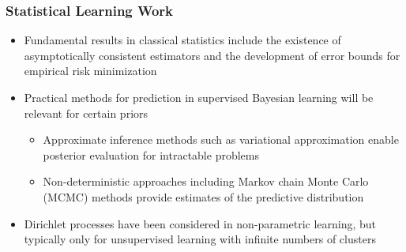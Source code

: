 \documentclass[aspectratio=169,usenames,dvipsnames]{beamer}
\begin{document}
\begin{frame}
\frametitle{Statistical Learning Work}

\begin{itemize}
\item Fundamental results in classical statistics include the existence of asymptotically consistent estimators  and the development of error bounds for empirical risk minimization 
\vspace{0.5em}
\item Practical methods for prediction in supervised Bayesian learning will be relevant for certain priors
	\vspace{0.25em}
	\begin{itemize}
	\item Approximate inference methods such as variational approximation  enable posterior evaluation for intractable problems
	\vspace{0.25em}
	\item Non-deterministic approaches including Markov chain Monte Carlo (MCMC) methods  provide estimates of the predictive distribution
	\end{itemize}
\vspace{0.5em}
\item Dirichlet processes have been considered in non-parametric learning, but typically only for unsupervised learning with infinite numbers of clusters 
\end{itemize}
\vspace{0.5em}

\end{frame}
\end{document}
